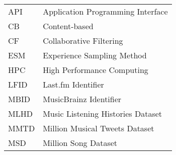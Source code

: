 \documentclass[12pt,letterpaper]{report}
\begin{document}
\begin{longtable}{ll}

  API & Application Programming Interface\\
  CB & Content-based\\
  CF & Collaborative Filtering\\
  ESM & Experience Sampling Method\\
  HPC & High Performance Computing\\
  LFID & Last.fm Identifier\\
  MBID & MusicBrainz Identifier\\
  MLHD & Music Listening Histories Dataset\\
  MMTD & Million Musical Tweets Dataset\\
  MSD & Million Song Dataset
  
\end{longtable}


\cleardoublepage
{}


\typeout{}
\setcounter{page}{1}



\typeout{}
\setcounter{chapter}{1} %
 


\typeout{}
\setcounter{chapter}{2} %
 

\typeout{}
\setcounter{chapter}{3} %


\typeout{}
\setcounter{chapter}{4} %


\typeout{}
\setcounter{chapter}{5} %

\end{document}
